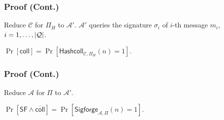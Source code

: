 \begin{frame}\frametitle{Proof (Cont.)}
Reduce $\mathcal{C}$ for $\Pi_H$ to $\mathcal{A}'$. $\mathcal{A}'$ queries the signature $\sigma_i$ of $i$-th message $m_i$, $i = 1,\dotsc,\lvert\mathcal{Q}\rvert$.
\begin{figure}
\begin{center}

\end{center}
\end{figure}
$\Pr[\mathsf{coll}] = \Pr[\mathsf{Hashcoll}_{\mathcal{C},\Pi_H}(n)=1]$.
\end{frame}
\begin{frame}\frametitle{Proof (Cont.)}
Reduce $\mathcal{A}$ for $\Pi$ to $\mathcal{A}'$.
\begin{figure}
\begin{center}

\end{center}
\end{figure}
$\Pr[\mathsf{SF} \land \overline{\mathsf{coll}}] = \Pr[\mathsf{Sigforge}_{\mathcal{A},\Pi}(n)=1]$.
\end{frame}
